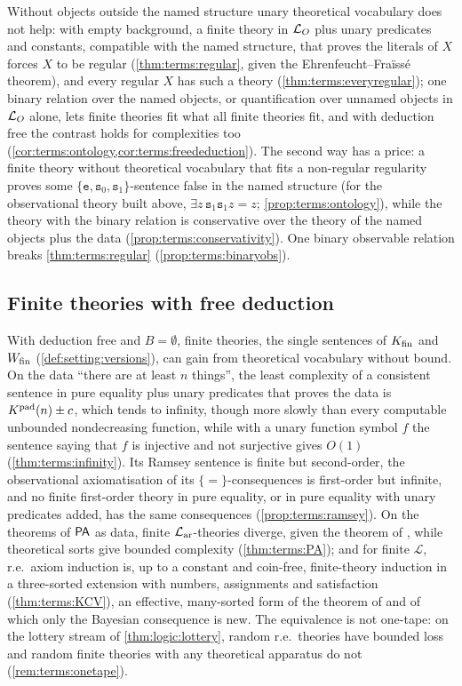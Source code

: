 Without objects outside the named structure unary theoretical vocabulary does not help: with empty background, a finite theory in $\mathcal{L}_{O}$ plus unary predicates and constants, compatible with the named structure, that proves the literals of $X$ forces $X$ to be regular (\cref{thm:terms:regular}, given the Ehrenfeucht--Fraïssé theorem), and every regular $X$ has such a theory (\cref{thm:terms:everyregular}); one binary relation over the named objects, or quantification over unnamed objects in $\mathcal{L}_{O}$ alone, lets finite theories fit what all finite theories fit, and with deduction free the contrast holds for complexities too (\cref{cor:terms:ontology,cor:terms:freededuction}). The second way has a price: a finite theory without theoretical vocabulary that fits a non-regular regularity proves some $\{\mathtt e,\mathtt s_0,\mathtt s_1\}$-sentence false in the named structure (for the observational theory built above, $\exists z\,\mathtt s_1\mathtt s_1z=z$; \cref{prop:terms:ontology}), while the theory with the binary relation is conservative over the theory of the named objects plus the data (\cref{prop:terms:conservativity}). One binary observable relation breaks \cref{thm:terms:regular} (\cref{prop:terms:binaryobs}).

\subsection{Finite theories with free deduction}\label{sec:terms:finite}

With deduction free and $B=\emptyset$, finite theories, the single sentences of $K_{\mathrm{fin}}$ and $W_{\mathrm{fin}}$ (\cref{def:setting:versions}), can gain from theoretical vocabulary without bound. On the data ``there are at least $n$ things'', the least complexity of a consistent sentence in pure equality plus unary predicates that proves the data is $K^{\mathrm{pad}}(n)\pm c$, which tends to infinity, though more slowly than every computable unbounded nondecreasing function, while with a unary function symbol $f$ the sentence saying that $f$ is injective and not surjective gives $O(1)$ (\cref{thm:terms:infinity}). Its Ramsey sentence is finite but second-order, the observational axiomatisation of its $\{=\}$-consequences is first-order but infinite, and no finite first-order theory in pure equality, or in pure equality with unary predicates added, has the same consequences (\cref{prop:terms:ramsey}). On the theorems of $\mathsf{PA}$ as data, finite $\mathcal{L}_{\mathrm{ar}}$-theories diverge, given the theorem of \citet{rylnardzewski1952role}, while theoretical sorts give bounded complexity (\cref{thm:terms:PA}); and for finite $\mathcal L$, r.e.\ axiom induction is, up to a constant and coin-free, finite-theory induction in a three-sorted extension with numbers, assignments and satisfaction (\cref{thm:terms:KCV}), an effective, many-sorted form of the theorem of \citet{kleene1952finite} and \citet{craigvaught1958finite} of which only the Bayesian consequence is new. The equivalence is not one-tape: on the lottery stream of \cref{thm:logic:lottery}, random r.e.\ theories have bounded loss and random finite theories with any theoretical apparatus do not (\cref{rem:terms:onetape}).

